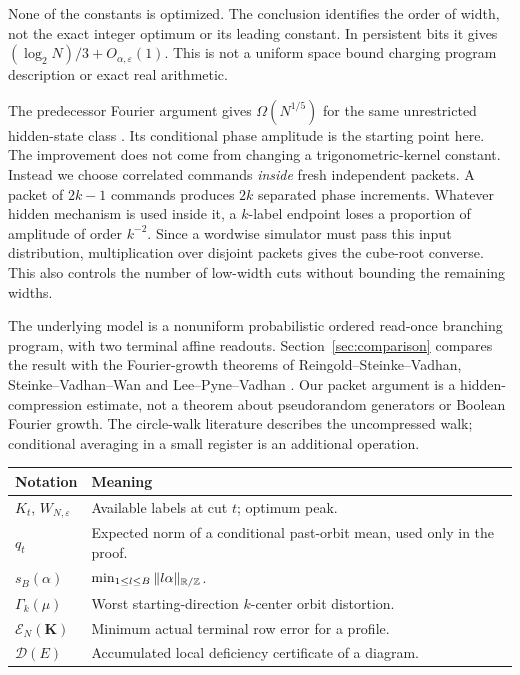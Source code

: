 None of the constants is optimized. The conclusion identifies the order
of width, not the exact integer optimum or its leading constant.
In persistent bits it gives $(\log_2N)/3+O_{\alpha,\varepsilon}(1)$.
This is not a uniform space bound charging program description or exact
real arithmetic.

The predecessor Fourier argument gives $\Omega(N^{1/5})$ for the same
unrestricted hidden-state class \cite{GTF34}. Its conditional phase
amplitude is the starting point here. The improvement does not come from
changing a trigonometric-kernel constant. Instead we choose correlated
commands \emph{inside} fresh independent packets. A packet of $2k-1$
commands produces $2k$ separated phase increments. Whatever hidden
mechanism is used inside it, a $k$-label endpoint loses a proportion of
amplitude of order $k^{-2}$. Since a wordwise simulator must pass this
input distribution, multiplication over disjoint packets gives the
cube-root converse. This also controls the number of low-width cuts
without bounding the remaining widths.

The underlying model is a nonuniform probabilistic ordered read-once
branching program, with two terminal affine readouts. Section~\ref{sec:comparison}
compares the result with the Fourier-growth theorems of
Reingold--Steinke--Vadhan, Steinke--Vadhan--Wan and Lee--Pyne--Vadhan
\cite{RSV,SVW,LPV}. Our packet argument is a hidden-compression estimate,
not a theorem about pseudorandom generators or Boolean Fourier growth.
The circle-walk literature \cite{BB} describes the uncompressed walk;
conditional averaging in a small register is an additional operation.

\begin{center}
\begin{tabular}{p{}p{}}
\toprule
Notation & Meaning\\\midrule
$K_t$, $W_{N,\varepsilon}$ & Available labels at cut $t$; optimum peak.\\
$q_t$ & Expected norm of a conditional past-orbit mean, used only in the proof.\\
$s_B(\alpha)$ & $\min_{1\le l\le B}\|l\alpha\|_{\mathbb R/\mathbb Z}$.\\
$\Gamma_k(\mu)$ & Worst starting-direction $k$-center orbit distortion.\\
$\mathcal E_N(\mathbf K)$ & Minimum actual terminal row error for a profile.\\
$\mathcal D(E)$ & Accumulated local deficiency certificate of a diagram.\\
\bottomrule
\end{tabular}
\end{center}

